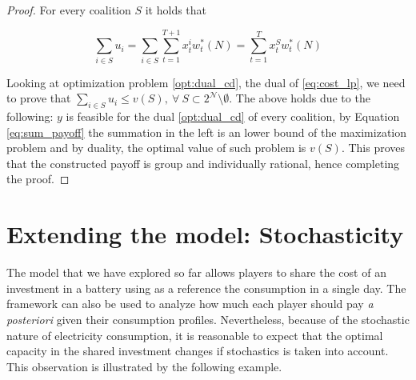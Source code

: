 \documentclass[sigconf, table]{acmart}
\begin{document}
\begin{proof}
For every coalition $S$ it holds that 

\begin{equation}\label{eq:sum_payoff}
\sum_{i\in S}u_i = \sum_{i \in S}\sum_{t=1}^{T+1} x^i_tw^*_t(N) = \sum_{t=1}^{T} x^S_t w^*_t(N)
\end{equation}

Looking at optimization problem \eqref{opt:dual_cd}, the dual of \eqref{eq:cost_lp}, we need to prove that $\sum_{i \in S} u_i \leq v(S), \ \forall \ S \subset 2^\mathcal{N} \setminus \emptyset$. The above holds due to the following: $y$ is feasible for the dual \eqref{opt:dual_cd} of every coalition, by Equation \eqref{eq:sum_payoff}  the summation in the left is an lower bound of the maximization problem and by duality, the optimal value of such problem is $v(S)$. 
This proves that the constructed payoff is group and individually rational, hence completing the proof. 
\end{proof}

\section{Extending the model: Stochasticity}\label{sec:stoc}

The model that we have explored so far allows players to share the cost of an investment in a battery using as a reference the consumption in a single day. The framework can also be used to analyze how much each player should pay \textit{a posteriori} given their consumption profiles. Nevertheless, because of the stochastic nature of electricity consumption, it is reasonable to expect that the optimal capacity in the shared investment changes if stochastics is taken into account. This observation is illustrated by the following example.
\end{document}
